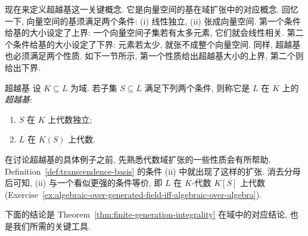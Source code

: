 现在来定义超越基这一关键概念. 它是向量空间的基在域扩张中的对应概念. 回忆一下, 向量空间的基须满足两个条件: (i) 线性独立, (ii) 张成向量空间. 第一个条件给基的大小设定了上界: 一个向量空间子集若有太多元素, 它们就会线性相关. 第二个条件给基的大小设定了下界: 元素若太少, 就张不成整个向量空间. 同样, 超越基也必须满足两个性质. 如下一节所示, 第一个性质给出超越基大小的上界, 第二个则给出下界.

\begin{Definition}{超越基}\leavevmode\label{def:transcendence-basis}
设 $K\subseteq L$ 为域. 若子集 $S\subseteq L$ 满足下列两个条件, 则称它是 $L$ 在 $K$ 上的\emph{超越基}:
\begin{enumerate}
  \item[(i)] $S$ 在 $K$ 上代数独立;
  \item[(ii)] $L$ 在 $K(S)$ 上代数.
\end{enumerate}
\end{Definition}

\begin{BookFlowNote}[l]{%
在讨论超越基的具体例子之前, 先熟悉代数域扩张的一些性质会有所帮助. Definition~\ref{def:transcendence-basis} 的条件 (ii) 中就出现了这样的扩张.
}
\noindent 消去分母后可知, (ii) 与一个看似更强的条件等价, 即 $L$ 在 $K$-代数 $K[S]$ 上代数 (Exercise~\ref{ex:algebraic-over-generated-field-iff-algebraic-over-algebra}).

下面的结论是 Theorem~\ref{thm:finite-generation-integrality} 在域中的对应结论, 也是我们所需的关键工具.
\end{BookFlowNote}

